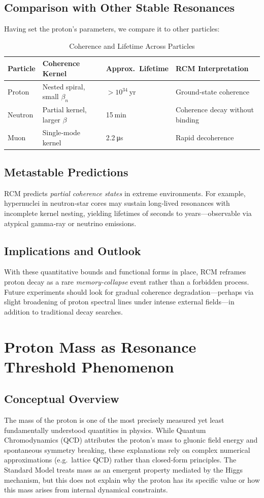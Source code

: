 \subsection{Comparison with Other Stable Resonances}
Having set the proton’s parameters, we compare it to other particles:

\begin{table}[ht]
  \centering
  \caption{Coherence and Lifetime Across Particles}
  \begin{tabular}{@{}llll@{}}
    \toprule
    Particle & Coherence Kernel & Approx.\ Lifetime & RCM Interpretation \\
    \midrule
    Proton  & Nested spiral, small \(\beta_n\) & \(>10^{34}\) yr & Ground‐state coherence \\
    Neutron & Partial kernel, larger \(\beta\) & 15 min        & Coherence decay without binding \\
    Muon    & Single‐mode kernel              & 2.2 μs        & Rapid decoherence \\
    \bottomrule
  \end{tabular}
\end{table}

\subsection{Metastable Predictions}
RCM predicts \emph{partial coherence states} in extreme environments.  For example, hypernuclei in neutron‐star cores may sustain long‐lived resonances with incomplete kernel nesting, yielding lifetimes of seconds to years—observable via atypical gamma‐ray or neutrino emissions.

\subsection{Implications and Outlook}
With these quantitative bounds and functional forms in place, RCM reframes proton decay as a rare \emph{memory‐collapse} event rather than a forbidden process.  Future experiments should look for gradual coherence degradation—perhaps via slight broadening of proton spectral lines under intense external fields—in addition to traditional decay searches.

\section{Proton Mass as Resonance Threshold Phenomenon}

\subsection{Conceptual Overview}
The mass of the proton is one of the most precisely measured yet least fundamentally understood quantities in physics. While Quantum Chromodynamics (QCD) attributes the proton’s mass to gluonic field energy and spontaneous symmetry breaking, these explanations rely on complex numerical approximations (e.g.\ lattice QCD) rather than closed‐form principles. The Standard Model treats mass as an emergent property mediated by the Higgs mechanism, but this does not explain why the proton has its specific value or how this mass arises from internal dynamical constraints.

